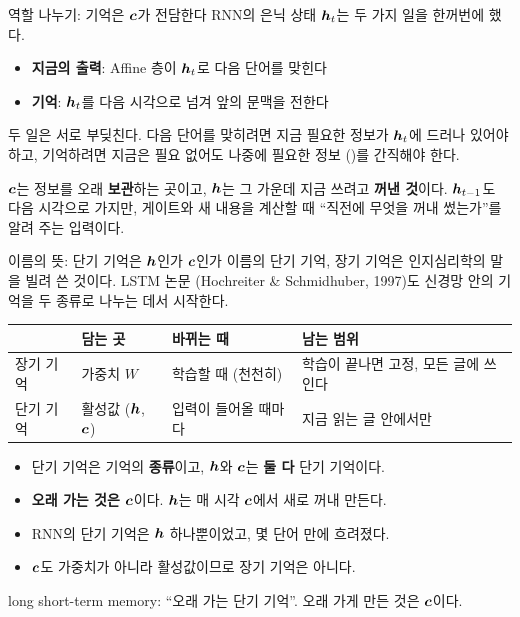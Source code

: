 \documentclass[aspectratio=169,11pt]{beamer}
\begin{document}
\begin{frame}{역할 나누기: 기억은 $\bm{c}$가 전담한다}
RNN의 은닉 상태 $\bm{h}_t$는 두 가지 일을 한꺼번에 했다.
\begin{itemize}
\item \textbf{지금의 출력}: Affine 층이 $\bm{h}_t$로 다음 단어를 맞힌다
\item \textbf{기억}: $\bm{h}_t$를 다음 시각으로 넘겨 앞의 문맥을 전한다
\end{itemize}
두 일은 서로 부딪친다. 다음 단어를 맞히려면 지금 필요한 정보가 $\bm{h}_t$에 드러나 있어야 하고,
기억하려면 지금은 필요 없어도 나중에 필요한 정보 ()를 간직해야 한다.
\vskip2mm
\begin{keybox}
$\bm{c}$는 정보를 오래 \textbf{보관}하는 곳이고, $\bm{h}$는 그 가운데 지금 쓰려고 \textbf{꺼낸 것}이다.
$\bm{h}_{t-1}$도 다음 시각으로 가지만, 게이트와 새 내용을 계산할 때
``직전에 무엇을 꺼내 썼는가''를 알려 주는 입력이다.
\end{keybox}
\end{frame}

\begin{frame}{이름의 뜻: 단기 기억은 $\bm{h}$인가 $\bm{c}$인가}
이름의 단기 기억, 장기 기억은 인지심리학의 말을 빌려 쓴 것이다.
LSTM 논문 (Hochreiter \& Schmidhuber, 1997)도 신경망 안의 기억을 두 종류로 나누는 데서 시작한다.
\vskip1mm
\begin{center}
\small
\begin{tabular}{@{}llll@{}}
\toprule
& 담는 곳 & 바뀌는 때 & 남는 범위 \\
\midrule
장기 기억 & 가중치 $W$ & 학습할 때 (천천히) & 학습이 끝나면 고정, 모든 글에 쓰인다 \\
단기 기억 & 활성값 ($\bm{h}$, $\bm{c}$) & 입력이 들어올 때마다 & 지금 읽는 글 안에서만 \\
\bottomrule
\end{tabular}
\end{center}
\begin{itemize}
\item 단기 기억은 기억의 \textbf{종류}이고, $\bm{h}$와 $\bm{c}$는 \textbf{둘 다} 단기 기억이다.
\item \textbf{오래 가는 것은 $\bm{c}$}이다. $\bm{h}$는 매 시각 $\bm{c}$에서 새로 꺼내 만든다.
\item RNN의 단기 기억은 $\bm{h}$ 하나뿐이었고, 몇 단어 만에 흐려졌다.
\item $\bm{c}$도 가중치가 아니라 활성값이므로 장기 기억은 아니다.
\end{itemize}
\begin{keybox}
long short-term memory: ``오래 가는 단기 기억''. 오래 가게 만든 것은 $\bm{c}$이다.
\end{keybox}
\end{frame}
\end{document}
